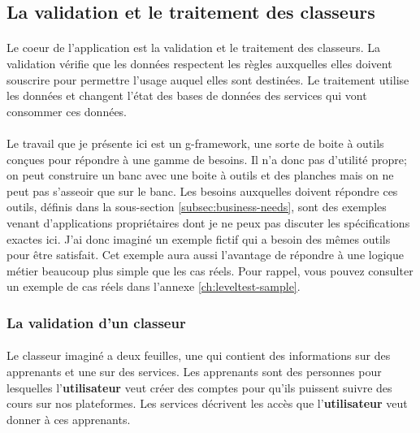 \subsection{La validation et le traitement des classeurs}
\label{subsec:spreadsheet-use-case}

\paragraph{}
Le coeur de l'application est la validation et le traitement des classeurs.
La validation vérifie que les données respectent les règles auxquelles elles doivent souscrire pour permettre l'usage auquel elles sont destinées.
Le traitement utilise les données et changent l'état des bases de données des services qui vont consommer ces données.

\paragraph{}
Le travail que je présente ici est un \gls{g-framework}, une sorte de boite à outils conçues pour répondre à une gamme de besoins.
Il n'a donc pas d'utilité propre; on peut construire un banc avec une boite à outils et des planches mais on ne peut pas s'asseoir que sur le banc.
Les besoins auxquelles doivent répondre ces outils, définis dans la sous-section \ref{subsec:business-needs}, sont des exemples venant d'applications propriétaires dont je ne peux pas discuter les spécifications exactes ici.
J'ai donc imaginé un exemple fictif qui a besoin des mêmes outils pour être satisfait.
Cet exemple aura aussi l'avantage de répondre à une logique métier beaucoup plus simple que les cas réels.
Pour rappel, vous pouvez consulter un exemple de cas réels dans l'annexe \ref{ch:leveltest-sample}.

\subsubsection{La validation d'un classeur}
\label{subsubsec:spreadsheet-validation-case}

\paragraph{}
Le classeur imaginé a deux feuilles, une qui contient des informations sur des apprenants et une sur des services.
Les apprenants sont des personnes pour lesquelles l'\textbf{utilisateur} veut créer des comptes pour qu'ils puissent suivre des cours sur nos plateformes.
Les services décrivent les accès que l'\textbf{utilisateur} veut donner à ces apprenants.

